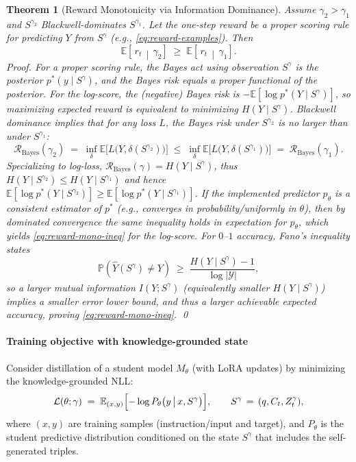 \documentclass[preprint,12pt]{elsarticle}
\def\textit#1{#1}%
\newtheorem{theorem}{Theorem}[section]
\begin{document}
\begin{theorem}[Reward Monotonicity via Information Dominance]
\label{thm:reward-mono}
Assume $\gamma_2>\gamma_1$ and $S^{\gamma_2}$ Blackwell-dominates $S^{\gamma_1}$.
Let the one-step reward be a proper scoring rule for predicting $Y$ from $S^\gamma$ (e.g., \eqref{eq:reward-examples}).
Then
\begin{equation}
\mathbb{E}\!\left[\, r_t \,\middle|\, \gamma_2 \right]
\;\ge\;
\mathbb{E}\!\left[\, r_t \,\middle|\, \gamma_1 \right].
\label{eq:reward-mono-ineq}
\end{equation}
\textit{Proof.}
For a proper scoring rule, the Bayes act using observation $S^\gamma$ is
the posterior $p^\ast(y\mid S^\gamma)$, and the Bayes risk equals a proper functional of the posterior.
For the log-score, the (negative) Bayes risk is $-\mathbb{E}[\log p^\ast(Y\mid S^\gamma)]$,
so maximizing expected reward is equivalent to minimizing $H(Y\mid S^\gamma)$.
Blackwell dominance implies that for any loss $L$, the Bayes risk under $S^{\gamma_2}$ is no larger than under $S^{\gamma_1}$:
\begin{equation}
\mathcal{R}_{\mathrm{Bayes}}(\gamma_2)
\;=\;
\inf_\delta \mathbb{E}\bigl[L\bigl(Y,\delta(S^{\gamma_2})\bigr)\bigr]
\;\le\;
\inf_\delta \mathbb{E}\bigl[L\bigl(Y,\delta(S^{\gamma_1})\bigr)\bigr]
\;=\;
\mathcal{R}_{\mathrm{Bayes}}(\gamma_1).
\label{eq:bayes-risk-ineq}
\end{equation}
Specializing to log-loss, $\mathcal{R}_{\mathrm{Bayes}}(\gamma)=H(Y\mid S^\gamma)$,
thus $H(Y\mid S^{\gamma_2})\le H(Y\mid S^{\gamma_1})$ and hence
$\mathbb{E}[\log p^\ast(Y\mid S^{\gamma_2})]\ge \mathbb{E}[\log p^\ast(Y\mid S^{\gamma_1})]$.
If the implemented predictor $p_\theta$ is a \emph{consistent} estimator of $p^\ast$
(e.g., converges in probability/uniformly in $\theta$), then by dominated convergence the same inequality holds in expectation for $p_\theta$,
which yields \eqref{eq:reward-mono-ineq} for the log-score.
For $0$--$1$ accuracy, Fano's inequality states
\[
\mathbb{P}\!\left(\hat{Y}(S^\gamma)\neq Y\right)
\;\ge\;
\frac{H(Y\mid S^\gamma)-1}{\log|\mathcal{Y}|},
\]
so a larger mutual information $I(Y;S^\gamma)$ (equivalently smaller $H(Y\mid S^\gamma)$) implies a smaller error lower bound,
and thus a larger achievable expected accuracy, proving \eqref{eq:reward-mono-ineq}.
\qed
\end{theorem}

\paragraph{Training objective with knowledge-grounded state}
Consider distillation of a student model $M_\theta$ (with LoRA updates) by minimizing the knowledge-grounded NLL:
\begin{equation}
\mathcal{L}(\theta;\gamma)
\;=\;
\mathbb{E}_{(x,y)}
\Bigl[
-\log P_\theta\bigl(y \,\big|\, x, S^\gamma\bigr)
\Bigr],
\qquad
S^\gamma \,=\, (q,C_t,Z_t^\gamma),
\label{eq:student-obj-extended}
\end{equation}
\textit{where} $(x,y)$ are training samples (instruction/input and target), and $P_\theta$ is the student predictive distribution
conditioned on the state $S^\gamma$ that includes the self-generated triples.
\end{document}
